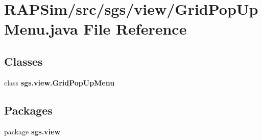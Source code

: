 \section{R\-A\-P\-Sim/src/sgs/view/\-Grid\-Pop\-Up\-Menu.java File Reference}
\label{_grid_pop_up_menu_8java}
\subsection*{Classes}
\begin{DoxyCompactItemize}
\item 
class {\bf sgs.\-view.\-Grid\-Pop\-Up\-Menu}
\end{DoxyCompactItemize}
\subsection*{Packages}
\begin{DoxyCompactItemize}
\item 
package {\bf sgs.\-view}
\end{DoxyCompactItemize}
